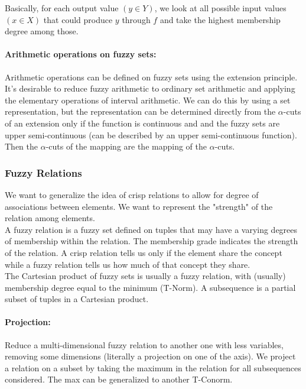 Basically, for each output value $(y\in Y)$, we look at all possible input values $(x \in X)$ that could produce $y$ through $f$ and take the highest membership degree among those.\\

\paragraph{Arithmetic operations on fuzzy sets:} Arithmetic operations can be defined on fuzzy sets using the extension principle. It's desirable to reduce fuzzy arithmetic to ordinary set arithmetic and applying the elementary operations of interval arithmetic. We can do this by using a set representation, but the representation can be determined directly from the $\alpha$-cuts of an extension only if the function is continuous and and the fuzzy sets are upper semi-continuous (can be described by an upper semi-continuous function). Then the $\alpha$-cuts of the mapping are the mapping of the $\alpha$-cuts.\\

\subsubsection{Fuzzy Relations}
We want to generalize the idea of crisp relations to allow for degree of associations between elements. We want to represent the "strength" of the relation among elements.\\

A fuzzy relation is a fuzzy set defined on tuples that may have a varying degrees of membership within the relation. The membership grade indicates the strength of the relation. A crisp relation tells us only if the element share the concept while a fuzzy relation tells us how much of that concept they share.\\

The Cartesian product of fuzzy sets is usually a fuzzy relation, with (usually) membership degree equal to the minimum (T-Norm). A subsequence is a partial subset of tuples in a Cartesian product.\\

\paragraph{Projection:} Reduce a multi-dimensional fuzzy relation to another one with less variables, removing some dimensions (literally a projection on one of the axis). We project a relation on a subset by taking the maximum in the relation for all subsequences considered. The max can be generalized to another T-Conorm.\\

